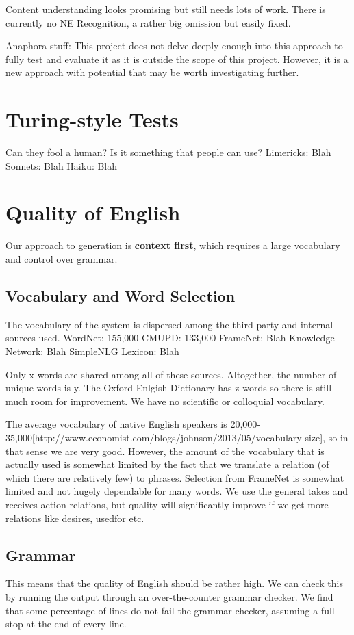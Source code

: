 Content understanding looks promising but still needs lots of work. There is currently no NE Recognition, a rather big omission but easily fixed.

Anaphora stuff:
This project does not delve deeply enough into this approach to fully test and evaluate it as it is outside the scope of this project. However, it is a new approach with potential that may be worth investigating further. 


\section{Turing-style Tests}
Can they fool a human?
Is it something that people can use?
Limericks: Blah
Sonnets: Blah
Haiku: Blah


\section{Quality of English}
Our approach to generation is \textbf{context first}, which requires a large vocabulary and control over grammar.
\subsection{Vocabulary and Word Selection}
The vocabulary of the system is dispersed among the third party and internal sources used.
WordNet: 155,000
CMUPD: 133,000
FrameNet: Blah
Knowledge Network: Blah
SimpleNLG Lexicon: Blah

Only x words are shared among all of these sources. Altogether, the number of unique words is y. The Oxford Enlgish Dictionary has z words so there is still much room for improvement. We have no scientific or colloquial vocabulary. 

The average vocabulary of native English speakers is 20,000-35,000[http://www.economist.com/blogs/johnson/2013/05/vocabulary-size], so in that sense we are very good. However, the amount of the vocabulary that is actually used is somewhat limited by the fact that we translate a relation (of which there are relatively few) to phrases. Selection from FrameNet is somewhat limited and not hugely dependable for many words. We use the general takes and receives action relations, but quality will significantly improve if we get more relations like desires, usedfor etc.

\subsection{Grammar}
This means that the quality of English should be rather high. We can check this by running the output through an over-the-counter grammar checker. We find that some percentage of lines do not fail the grammar checker, assuming a full stop at the end of every line.

